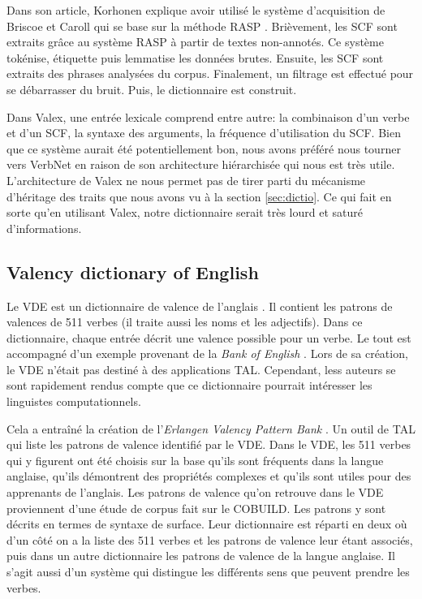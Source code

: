 Dans son article, Korhonen explique avoir utilisé le système d'acquisition de Briscoe et Caroll qui se base sur la méthode RASP \citep{BriscoeSecondReleaseRASP2006}. Brièvement, les \ac{SCF} sont extraits grâce au système RASP à partir de textes non-annotés. Ce système tokénise, étiquette puis lemmatise les données brutes. Ensuite, les \ac{SCF} sont extraits des phrases analysées du corpus. Finalement, un filtrage est effectué pour se débarrasser du bruit. Puis, le dictionnaire est construit. 

Dans Valex, une entrée lexicale comprend entre autre: la combinaison d'un verbe et d'un SCF, la syntaxe des arguments, la fréquence d'utilisation du SCF. Bien que ce système aurait été potentiellement bon, nous avons préféré nous tourner vers VerbNet en raison de son architecture hiérarchisée qui nous est très utile. L'architecture de Valex ne nous permet pas de tirer parti du mécanisme d'héritage des traits que nous avons vu à la section \ref{sec:dictio}. Ce qui fait en sorte qu'en utilisant Valex, notre dictionnaire serait très lourd et saturé d'informations.

\subsection{Valency dictionary of English}
Le \acf{VDE} est un dictionnaire de valence de l'anglais \citep{HerbstValencyDictionaryEnglish2004}. Il contient les patrons de valences de 511 verbes (il traite aussi les noms et les adjectifs). Dans ce dictionnaire, chaque entrée décrit une valence possible pour un verbe. Le tout est accompagné d'un exemple provenant de la \emph{Bank of English} . Lors de sa création, le VDE n'était pas destiné à des applications TAL. Cependant, less auteurs se sont rapidement rendus compte que ce dictionnaire pourrait intéresser les linguistes computationnels. 

Cela a entraîné la création de l'\emph{Erlangen Valency Pattern Bank} \citep{faucris.1039365}. Un outil de TAL qui liste les patrons de valence identifié par le VDE.  Dans le VDE, les 511 verbes qui y figurent ont été choisis sur la base qu'ils sont fréquents dans la langue anglaise, qu'ils démontrent des propriétés complexes et qu'ils sont utiles pour des apprenants de l'anglais. Les patrons de valence qu'on retrouve dans le VDE proviennent d'une étude de corpus fait sur le COBUILD. Les patrons y sont décrits en termes de syntaxe de surface.  Leur dictionnaire est réparti en deux où d'un côté on a la liste des 511 verbes et les patrons de valence leur étant associés, puis dans un autre dictionnaire les patrons de valence de la langue anglaise. Il s'agit aussi d'un système qui distingue les différents sens que peuvent prendre les verbes. 

